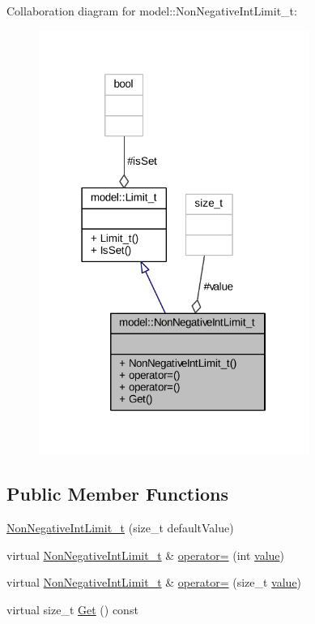 Collaboration diagram for model\+:\+:Non\+Negative\+Int\+Limit\+\_\+t\+:
\nopagebreak
\begin{figure}[H]
\begin{center}
\leavevmode
\includegraphics[width=250pt]{classmodel_1_1_non_negative_int_limit__t__coll__graph}
\end{center}
\end{figure}
\subsection*{Public Member Functions}
\begin{DoxyCompactItemize}
\item 
\hyperlink{classmodel_1_1_non_negative_int_limit__t_aea21e30f42272205e44bf14fedd7e56d}{Non\+Negative\+Int\+Limit\+\_\+t} (size\+\_\+t default\+Value)
\item 
virtual \hyperlink{classmodel_1_1_non_negative_int_limit__t}{Non\+Negative\+Int\+Limit\+\_\+t} \& \hyperlink{classmodel_1_1_non_negative_int_limit__t_a2ddd1520be8f5565c8e22ae7264baab2}{operator=} (int \hyperlink{classmodel_1_1_non_negative_int_limit__t_aca4f56e8c716086b2bfc9c54dbd22ee7}{value})
\item 
virtual \hyperlink{classmodel_1_1_non_negative_int_limit__t}{Non\+Negative\+Int\+Limit\+\_\+t} \& \hyperlink{classmodel_1_1_non_negative_int_limit__t_a125f0d43845eec1338fa4c587be56eb8}{operator=} (size\+\_\+t \hyperlink{classmodel_1_1_non_negative_int_limit__t_aca4f56e8c716086b2bfc9c54dbd22ee7}{value})
\item 
virtual size\+\_\+t \hyperlink{classmodel_1_1_non_negative_int_limit__t_a21717a2f26d46d96514193de05fe3cbc}{Get} () const 
\end{DoxyCompactItemize}

